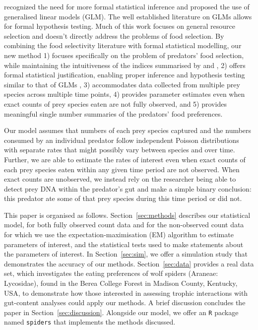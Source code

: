 \documentclass[smallextended]{svjour3}
\begin{document}
\citet{Manly:2002} recognized the need for more formal statistical inference and proposed the use of generalised linear models (GLM).  The well established literature on GLMs allows for formal hypothesis testing.  Much of this work focuses on general resource selection and doesn't directly address the problems of food selection.  By combining the food selectivity literature with formal statistical modelling, our new method 1) focuses specifically on the problem of predators' food selection, while maintaining the intuitiveness of the indices summarised by \citet{Lechowicz:1982} and \citet{Manly:2002}, 2) offers formal statistical justification, enabling proper inference and hypothesis testing similar to that of GLMs \citep{Manly:2002}, 3) accommodates data collected from multiple prey species across multiple time points, 4) provides parameter estimates even when exact counts of prey species eaten are not fully observed, and 5) provides meaningful single number summaries of the predators' food preferences.

Our model assumes that numbers of each prey species captured and the numbers consumed by an individual predator follow independent Poisson distributions with separate rates that might possibly vary between species and over time.  Further, we are able to estimate the rates of interest even when exact counts of each prey species eaten within any given time period are not observed.  When exact counts are unobserved, we instead rely on the researcher being able to detect prey DNA within the predator's gut \citep{Schmidt:2014,Raso:2014,Madduppa:2014} and make a simple binary conclusion: this predator ate some of that prey species during this time period or did not.  

This paper is organised as follows.  Section~\ref{sec:methods} describes our statistical model, for both fully observed count data and for the non-observed count data for which we use the expectation-maximisation (EM) algorithm to estimate parameters of interest, and the statistical tests used to make statements about the parameters of interest.  In Section~\ref{sec:sim}, we offer a simulation study that demonstrates the accuracy of our methods.  Section~\ref{sec:data} provides a real data set, which investigates the eating preferences of wolf spiders (Araneae: Lycosidae), found in the Berea College Forest in Madison County, Kentucky, USA, to demonstrate how those interested in assessing trophic interactions with gut-content analyses could apply our methods.  A brief discussion concludes the paper in Section~\ref{sec:discussion}.  Alongside our model, we offer an \texttt{R} \citep{Core-Team:2014} package named \texttt{spiders} that implements the methods discussed.  
\end{document}
